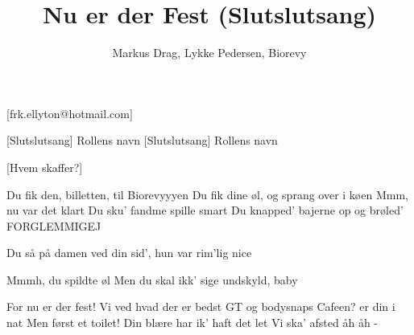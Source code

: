 \documentclass[a4paper,12pt]{article}
\title{Nu er der Fest (Slutslutsang)}
\author{Markus Drag, Lykke Pedersen, Biorevy}
\begin{document}
\maketitle

\begin{texxers}
	[frk.ellyton@hotmail.com]
\end{texxers}

\begin{roles}
	[Slutslutsang] Rollens navn
	[Slutslutsang] Rollens navn
\end{roles}


\begin{props}
	[Hvem skaffer?] 
\end{props}

\begin{song}

Du fik den, billetten, til Biorevyyyen
Du fik dine øl, og sprang over i køen
Mmm, nu var det klart
Du sku' fandme spille smart
Du knapped' bajerne op og brøled' FORGLEMMIGEJ

Du så på damen ved din sid', hun var rim'lig nice

Mmmh, du spildte øl
Men du skal ikk' sige undskyld, baby

For nu er der fest!
Vi ved hvad der er bedst
GT og bodysnaps
Cafeen? er din i nat
Men først et toilet!
Din blære har ik' haft det let
Vi ska' afsted åh åh
-


\end{song}
\end{document}
